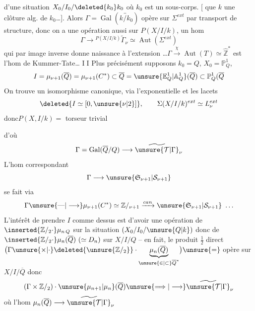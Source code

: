  d'une situation $X_0/I_0/\deleted{k_0}k_0$
où $k_0$ est un sous-corps. [  que
$k$  une clôture alg. de $k_0$\ldots].
Alors $\Gamma=\operatorname{Gal}(\overleftrightarrow{k/k_0})$ opère sur
$\Sigma^{ext}$ par transport de structure, donc on a
une  opération aussi sur $P(X/I/k)$,
  un hom
\[
\Gamma\longrightarrow {}^{P(X/I/k)}\widetilde\Gamma_\nu\simeq\operatorname{Aut}(\Sigma^{ext})
\]
qui par image inverse  donne naissance
à l'extension
\ldots\quad $\Gamma\xrightarrow{\chi}\operatorname{Aut}(T)\simeq\widehat{\mathbb Z}^{*}$ est l'hom de
Kummer-Tate\ldots
\textcircled{II} Plus précisément supposons $k_0=Q$, $X_0=\mathbb P^1_Q$,
\[
I=\mu_{\nu+1}(\overline Q)=\mu_{\nu+1}(C^*)\subset\overline Q=\unsure{\mathbb E^1_Q|\mathbb A^1_Q}(\overline Q)\subset\mathbb P^1_Q(\overline Q
\]
On trouve un isomorphisme canonique,
via l'exponentielle et les lacets
\[
\deleted{I\simeq[0,\unsure{\nu|2}]},
\qquad \Sigma(X/I/k)^{ext}\simeq L_\nu^{ext}
\]
donc\quad $P(X,I/k)=$ torseur trivial

d'où
\[
\Gamma=\operatorname{Gal}(\overline Q/Q)\longrightarrow\widetilde{\unsure{\mathcal T|\Gamma}}_\nu
\]
L'hom correspondant
\[
\Gamma\longrightarrow\unsure{\mathfrak S_{\nu+1}|\mathcal S_{\nu+1}}
\]
se fait via
\[
\Gamma\unsure{\text{---}|\longrightarrow}\mu_{\nu+1}(C^*)\simeq \mathbb Z/_{\nu+1}\xrightarrow{can}\unsure{\mathfrak S_{\nu+1}|\mathcal S_{\nu+1}}\ \ldots
\]
L'intérêt de prendre $I$ comme
dessus est d'avoir une opération
de $\inserted{\mathbb Z/_{2}\cdot}\mu_{n\,Q}$  sur la situation
$(X_0/I_0/\unsure{Q|k})$ donc de $\inserted{\mathbb Z/_{2}\cdot}\mu_n(\overline Q)\ (\simeq D_n)$
sur $X/I/Q$ -- en fait, le
produit $\frac12$ direct $\bigl(\Gamma\unsure{\times|\cdot}\deleted{\unsure{\mathbb Z/_{2}}}\cdot\underbrace{\mu_n(\overline Q)}_{\unsure{\in|\subset}\overline Q^{*}}\bigr)\unsure{=}$
opère sur $X/I/\overline Q$ donc
\[
(\Gamma\times \mathbb Z/_{2})\cdot\unsure{\mu_{n+1}|\mu_n}(\overline Q)\unsure{\Longrightarrow|\longrightarrow}\widetilde{\unsure{\mathcal T|\Gamma}}_\nu
\]
où l'hom $\mu_n(\overline Q)\longrightarrow\widetilde{\unsure{\mathcal T|\Gamma}}_\nu$

